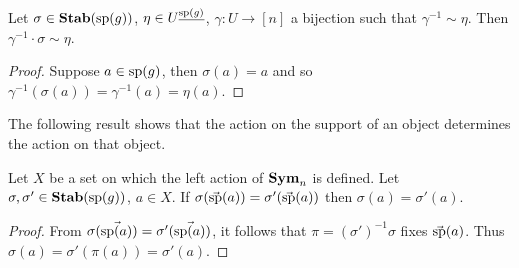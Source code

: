 \documentclass[../paper.tex]{subfiles}
\begin{document}


\begin{claim}
  Let $\sigma \in \text{\textbf{Stab}} (\text{sp} (g))$, $\eta \in U^{\underline{\text{sp}(g)}}$, $\gamma: U
  \rightarrow [n]$ a bijection such that $\gamma^{-1} \sim \eta$. Then
  $\gamma^{-1} \cdot \sigma \sim \eta$.
\end{claim}
\begin{proof}
  Suppose $a \in \text{sp}(g)$, then $\sigma (a) = a$ and so $\gamma^{-1} (\sigma
  (a)) = \gamma^{-1} (a) = \eta (a)$.
\end{proof}


The following result shows that the action on the support of an object
determines the action on that object.

\begin{lem}
  \label{lem:support_determine_action}
  Let $X$ be a set on which the left action of $\text{\textbf{Sym}}_n$ is defined. Let $\sigma,
  \sigma' \in \text{\textbf{Stab}} (\text{sp} (g))$, $a \in X$. If $\sigma (\vec{\text{sp}}(a)) = \sigma'
  (\vec{\text{sp}}(a))$ then $\sigma (a) = \sigma' (a)$.
\end{lem}
\begin{proof}
  From $\sigma (\vec{\text{sp}(a)}) = \sigma' (\vec{\text{sp}(a)})$, it follows that
  $\pi = (\sigma')^{-1} \sigma$ fixes $\vec{\text{sp}}(a)$. Thus $\sigma (a) =
  \sigma' (\pi (a)) = \sigma' (a)$.
\end{proof}
\end{document}
